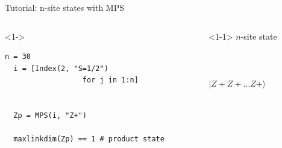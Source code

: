 \begin{frame}[fragile]{Tutorial: n-site states with MPS}

\begin{columns}

\begin{column}{4.5cm}

\begin{onlyenv}<1->
\begin{lstlisting}[language=JuliaLocal, style=julia, mathescape, basicstyle=\scriptsize\ttfamily]
  n = 30
  i = [Index(2, "S=1/2")
                  for j in 1:n]

  
  Zp = MPS(i, "Z+")

  maxlinkdim(Zp) == 1 # product state
\end{lstlisting}
\end{onlyenv}

\end{column}

\begin{column}{5.5cm}

\begin{onlyenv}<1-1>
\vspace*{-0.1cm}
$n$-site state \\
~\\
~\\
~\\
$|Z+Z+\dots Z+\rangle$ \\
~\\
~\\
\end{onlyenv}


\end{column}
\end{columns}
\end{frame}
